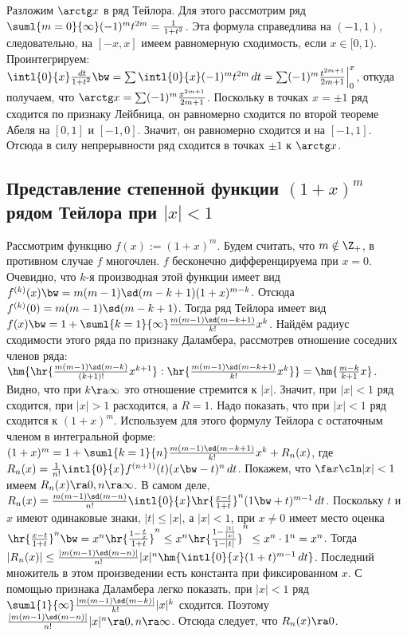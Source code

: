 \documentclass[a4paper]{article}
\begin{document}
Разложим $\arctg x$ в ряд Тейлора. Для этого рассмотрим ряд
$\suml{m=0}{\infty}(-1)^mt^{2m}=\frac{1}{1+t^2}$. Эта формула справедлива на $(-1,1)$,
следовательно, на $[-x,x]$ имеем равномерную сходимость, если $x \in [0,1)$. Проинтегрируем:
$\intl{0}{x}\frac{\,d t}{1+t^2}\bw=\sum \intl{0}{x}(-1)^mt^{2m}\,d t=\sum
(-1)^m\frac{t^{2m+1}}{2m+1}\Bigl|_0^x$, откуда получаем, что $\arctg x = \sum
(-1)^m\frac{x^{2m+1}}{2m+1}$. Поскольку в точках $x=\pm 1$ ряд сходится по признаку Лейбница, он
равномерно сходится по второй теореме Абеля на $[0,1]$ и $[-1,0]$. Значит, он равномерно сходится и
на $[-1,1]$. Отсюда в силу непрерывности ряд сходится в точках $\pm 1$ к $\arctg x$.

\subsection{Представление степенной функции $(1+x)^m$ рядом Тейлора при $|x| < 1$}

Рассмотрим функцию $f(x) := (1+x)^m$. Будем считать, что $m \notin \Z_+$, в противном
случае $f$ многочлен. $f$ бесконечно дифференцируема при $x=0$. Очевидно, что $k$-я производная
этой функции имеет вид $f^{(k)}(x) \bw= m(m-1)\sd(m-k+1)(1+x)^{m-k}$. Отсюда $f^{(k)}(0) =
m(m-1)\sd(m-k+1)$. Тогда ряд Тейлора имеет вид $f(x)\bw=1 +
\suml{k=1}{\infty}\frac{m(m-1)\sd(m-k+1)}{k!} x^k$. Найдём радиус сходимости этого ряда по признаку
Даламбера, рассмотрев отношение соседних членов ряда: $\hm{\hr{
\frac{m(m-1)\sd(m-k)}{(k+1)!}x^{k+1}} : \hr{ \frac{m(m-1)\sd(m-k+1)}{k!}x^k}}
=\hm{\frac{m-k}{k+1}x} $. Видно, что при $k \ra \infty$ это отношение стремится к $|x|$. Значит,
при $|x| < 1$ ряд сходится, при $|x| > 1$ расходится, а $R=1$. Надо показать, что при $|x|<1$ ряд
сходится к $(1+x)^m$. Используем для этого формулу Тейлора с остаточным членом в интегральной
форме: $(1+x)^m=1 + \suml{k=1}{n}\frac{m(m-1)\sd(m-k+1)}{k!} x^k + R_n(x)$, где $R_n(x) =
\frac{1}{n!}\intl{0}{x}f^{(n+1)}(t)(x\bw-t)^n\,d t$. Покажем, что $\fa x\cln |x|<1$ имеем $R_n(x) \ra 0,
n \ra \infty$. В самом деле, $R_n(x)=\frac{m(m-1)\sd(m-n)}{n!}\intl{0}{x}\hr{ \frac{x-t}{1+t}}
^n(1\bw+t)^{m-1}\,d t$. Поскольку $t$ и $x$ имеют одинаковые знаки, $|t|\le |x|$, а $|x| < 1$, при $x
\neq 0$ имеет место оценка $\hr{ \frac{x-t}{1+t}} ^n \bw= x^n\hr{ \frac{1-\frac{t}{x}}{1+t}} ^n \le
x^n \hr{ \frac{1-\frac{|t|}{|x|}}{1-|t|}} ^n \le x^n \cdot 1^n = x^n$. Тогда $|R_n(x)| \le
\frac{|m(m-1)\sd(m-n)|}{n!}|x|^n \hm{\intl{0}{x}(1+t)^{m-1}\,d t} $. Последний множитель в этом
произведении есть константа при фиксированном $x$. С помощью признака Даламбера легко показать, при
$|x|<1$ ряд $\suml{1}{\infty}\frac{|m(m-1)\sd(m-k)|}{k!}|x|^k$ сходится. Поэтому
$\frac{|m(m-1)\sd(m-n)|}{n!}|x|^n \ra 0, n \ra \infty$. Отсюда следует, что $R_n(x) \ra 0$.
\end{document}
